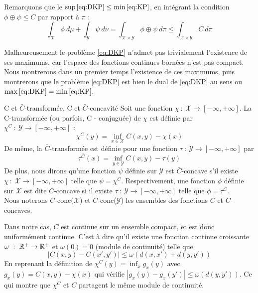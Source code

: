 \documentclass[a4paper,12pt]{article}
\begin{document}
\vspace{0.3cm}

Remarquons que le $\sup\eqref{eq:DKP} \leq \min\eqref{eq:KP}$, en intégrant la condition $\phi\oplus\psi \leq C$ par rapport à $\pi$ : 
$$
\int_{\mathcal{X}} \phi\ d\mu  + \int_{\mathcal{Y}}\psi\ d\nu = \int_{\mathcal{X}\times\mathcal{Y}} \phi\oplus\psi\ d\pi \leq \int_{\mathcal{X}\times\mathcal{Y}} C\ d\pi
$$

Malheureusement le problème \eqref{eq:DKP} n'admet pas trivialement l'existence de ses maximums, car l'espace des fonctions continues bornées n'est pas compact. Nous montrerons dans un premier temps l'existence de ces maximums, puis montrerons que le problème \eqref{eq:DKP} est bien le dual de \eqref{eq:DKP} au sens ou $\max\eqref{eq:DKP} =\min\eqref{eq:KP}$.


\begin{definition}{C et $\bar{C}$-transformée, C et $\bar{C}$-concavité}
Soit une fonction $\chi\ :\ \mathcal{X}\rightarrow [-\infty,+\infty]$. La C-transformée (ou parfois, C - conjuguée) de $\chi$ est définie par $\chi^C\ : \ \mathcal{Y}\rightarrow[-\infty,+\infty]$ : 
$$
\chi^C(y)=\inf_{x\in\mathcal{X}} C(x,y) -\chi(x)
$$
De même, la $\bar{C}$-transformée est définie pour une fonction $\tau\ :\ \mathcal{Y}\rightarrow [-\infty,+\infty]$ par 
$$
\tau^{\bar{C}}(x) = \inf_{y\in\mathcal{Y}} C(x,y) -\tau(y)
$$
De plus, nous dirons qu'une fonction $\psi$ définie sur $\mathcal{Y}$ est $\bar{C}$-concave s'il existe $\chi\ :\ \mathcal{X}\rightarrow [-\infty,+\infty]$ telle que $\psi = \chi^C$. Respectivement, une fonction $\phi$ définie sur $\mathcal{X}$ est dite $C$-concave si il existe $\tau\ :\ \mathcal{Y}\rightarrow [-\infty,+\infty]$ telle que $\phi=\tau^{\bar{C}}$. \\
Nous noterons $C$-conc($\mathcal{X}$) et $\bar{C}$-conc($\mathcal{Y}$) les ensembles des fonctions $C$ et $\bar{C}$-concaves. 
\end{definition}

Dans notre cas, $C$ est continue sur un ensemble compact, et est donc uniformément continue. C'est à dire qu'il existe une fonction continue croissante $\omega\ :\ \mathbb{R}^+\rightarrow\mathbb{R}^+$ et $\omega(0)=0$ (module de continuité) telle que 
$$
\left|C(x,y) - C(x',y')\right| \leq \omega(d(x,x') + d(y,y'))
$$
En reprenant la définition de $\chi^C(y) = \inf_x g_x(y)$ avec $g_x(y) = C(x,y)-\chi(x)$ qui vérifie $|g_x(y)-g_x(y')|\leq\omega(d(y,y'))$. Ce qui montre que $\chi^C$ et $C$ partagent le même module de continuité. \\
\end{document}

